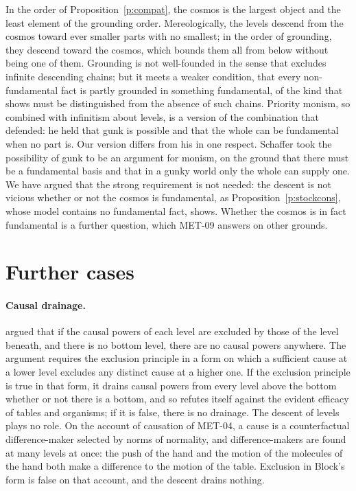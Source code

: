 \documentclass{situationist-preprint}
\begin{document}
In the order of Proposition~\ref{p:compat}, the cosmos is the largest object and the least element of the grounding order. Mereologically, the levels descend from the cosmos toward ever smaller parts with no smallest; in the order of grounding, they descend toward the cosmos, which bounds them all from below without being one of them. Grounding is not well-founded in the sense that excludes infinite descending chains; but it meets a weaker condition, that every non-fundamental fact is partly grounded in something fundamental, of the kind that \citet{Dixon2016} shows must be distinguished from the absence of such chains. Priority monism, so combined with infinitism about levels, is a version of the combination that \citet{Schaffer2010} defended: he held that gunk is possible and that the whole can be fundamental when no part is. Our version differs from his in one respect. Schaffer took the possibility of gunk to be an argument for monism, on the ground that there must be a fundamental basis and that in a gunky world only the whole can supply one. We have argued that the strong requirement is not needed: the descent is not vicious whether or not the cosmos is fundamental, as Proposition~\ref{p:stockcons}, whose model contains no fundamental fact, shows. Whether the cosmos is in fact fundamental is a further question, which MET-09 answers on other grounds.

\section{Further cases}\label{s:cases}

\paragraph{Causal drainage.} \citet{Block2003} argued that if the causal powers of each level are excluded by those of the level beneath, and there is no bottom level, there are no causal powers anywhere. The argument requires the exclusion principle in a form on which a sufficient cause at a lower level excludes any distinct cause at a higher one. If the exclusion principle is true in that form, it drains causal powers from every level above the bottom whether or not there is a bottom, and so refutes itself against the evident efficacy of tables and organisms; if it is false, there is no drainage. The descent of levels plays no role. On the account of causation of MET-04, a cause is a counterfactual difference-maker selected by norms of normality, and difference-makers are found at many levels at once: the push of the hand and the motion of the molecules of the hand both make a difference to the motion of the table. Exclusion in Block's form is false on that account, and the descent drains nothing.
\end{document}
